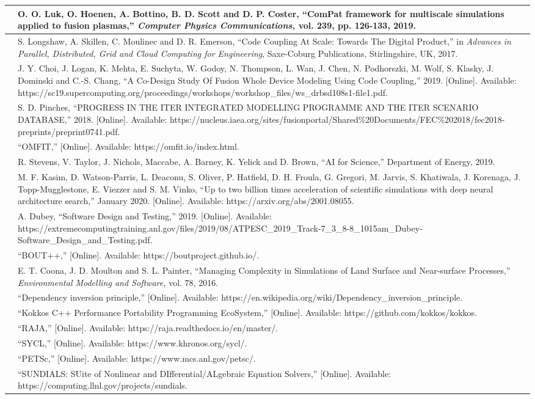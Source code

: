 \documentclass{article}
\begin{document}
\baselineskip=12pt
\begin{tabular}{|>{\raggedright}p{7pt}|>{\raggedright}p{313pt}|}
\hline
[1]  & O. O. Luk, O. Hoenen, A. Bottino, B. D. Scott and D. P. Coster, ``ComPat 
framework for multiscale simulations applied to fusion plasmas,'' \textit{Computer 
Physics Communications, }vol. 239, pp. 126-133, 2019. \tabularnewline
\hline
[2]  & S. Longshaw, A. Skillen, C. Moulinec and D. R. Emerson, ``Code Coupling 
At Scale: Towards The Digital Product,'' in \textit{Advances in Parallel, Distributed, 
Grid and Cloud Computing for Engineering}, Saxe-Coburg Publications, Stirlingshire, 
UK, 2017. \tabularnewline
\hline
[3]  & J. Y. Choi, J. Logan, K. Mehta, E. Suchyta, W. Godoy, N. Thompson, L. Wan, 
J. Chen, N. Podhorszki, M. Wolf, S. Klasky, J. Dominski and C.-S. Chang, ``A Co-Design 
Study Of Fusion Whole Device Modeling Using Code Coupling,'' 2019. [Online]. Available: 
https://sc19.supercomputing.org/proceedings/workshops/workshop\_files/ws\_drbsd108s1-file1.pdf.\tabularnewline
\hline
[4]  & S. D. Pinches, ``PROGRESS IN THE ITER INTEGRATED MODELLING PROGRAMME AND 
THE ITER SCENARIO DATABASE,'' 2018. [Online]. Available: https://nucleus.iaea.org/sites/fusionportal/Shared\%20Documents/FEC\%202018/fec2018-preprints/preprint0741.pdf.\tabularnewline
\hline
[5]  & ``OMFIT,'' [Online]. Available: https://omfit.io/index.html.\tabularnewline
\hline
[6]  & R. Stevens, V. Taylor, J. Nichols, Maccabe, A. Barney, K. Yelick and D. 
Brown, ``AI for Science,'' Department of Energy, 2019.\tabularnewline
\hline
[7]  & M. F. Kasim, D. Watson-Parris, L. Deaconu, S. Oliver, P. Hatfield, D. H. 
Froula, G. Gregori, M. Jarvis, S. Khatiwala, J. Korenaga, J. Topp-Mugglestone, 
E. Viezzer and S. M. Vinko, ``Up to two billion times acceleration of scientific 
simulations with deep neural architecture search,'' January 2020. [Online]. Available: 
https://arxiv.org/abs/2001.08055.\tabularnewline
\hline
[8]  & A. Dubey, ``Software Design and Testing,'' 2019. [Online]. Available: https://extremecomputingtraining.anl.gov/files/2019/08/ATPESC\_2019\_Track-7\_3\_8-8\_1015am\_Dubey-Software\_Design\_and\_Testing.pdf.\tabularnewline
\hline
[9]  & ``BOUT++,'' [Online]. Available: https://boutproject.github.io/.\tabularnewline
\hline
[10]  & E. T. Coona, J. D. Moulton and S. L. Painter, ``Managing Complexity in 
Simulations of Land Surface and Near-surface Processes,'' \textit{Environmental 
Modelling and Software, }vol. 78, 2016. \tabularnewline
\hline
[11]  & ``Dependency inversion principle,'' [Online]. Available: https://en.wikipedia.org/wiki/Dependency\_inversion\_principle.\tabularnewline
\hline
[12]  & ``Kokkos C++ Performance Portability Programming EcoSystem,'' [Online]. 
Available: https://github.com/kokkos/kokkos.\tabularnewline
\hline
[13]  & ``RAJA,'' [Online]. Available: https://raja.readthedocs.io/en/master/.\tabularnewline
\hline
[14]  & ``SYCL,'' [Online]. Available: https://www.khronos.org/sycl/.\tabularnewline
\hline
[15]  & ``PETSc,'' [Online]. Available: https://www.mcs.anl.gov/petsc/.\tabularnewline
\hline
[16]  & ``SUNDIALS: SUite of Nonlinear and DIfferential/ALgebraic Equation Solvers,'' 
[Online]. Available: https://computing.llnl.gov/projects/sundials.\tabularnewline
\hline
\end{tabular}

\newpage
\end{document}

